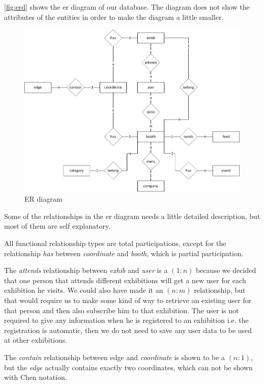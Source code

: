 \autoref{fig:erd} shows the \ac{er} diagram of our database. The diagram does not show the attributes of the entities in order to make the diagram a little smaller.

\begin{figure}[H]
\centering
\includegraphics[page=1,width=1\linewidth]{img/sw7ERD.pdf}
\caption{ER diagram}
\label{fig:erd}
\end{figure}

\newcommand{\rel}[2]{$(#1:#2)$}

Some of the relationships in the \ac{er} diagram needs a little detailed description, but most of them are self explanatory.

All functional relationship types are total participations, except for the relationship \textit{has} between \textit{coordinate} and \textit{booth}, which is partial participation.

The \textit{attends} relationship between \textit{exhib} and \textit{user} is a \rel{1}{n} because we decided that one person that attends different exhibitions will get a new user for each exhibition he visits. We could also have made it an \rel{n}{m} relationship, but that would require us to make some kind of way to retrieve an existing user for that person and then also subscribe him to that exhibition. The user is not required to give any information when he is registered to an exhibition i.e. the registration is automatic, then we do not need to save any user data to be used at other exhibitions.

The \textit{contain} relationship between edge and \textit{coordinate} is shown to be a \rel{n}{1}, but the \textit{edge} actually contains exactly two coordinates, which can not be shown with Chen notation.

